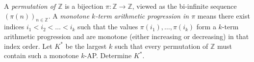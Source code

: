 A \emph{permutation of $\mathbb{Z}$} is a bijection $\pi:\mathbb{Z}\to\mathbb{Z}$, viewed as the bi-infinite sequence $(\pi(n))_{n\in\mathbb{Z}}$.
A \emph{monotone $k$-term arithmetic progression in $\pi$} means there exist indices $i_1<i_2<\dots<i_k$ such that the values
$\pi(i_1),\dots,\pi(i_k)$ form a $k$-term arithmetic progression and are monotone (either increasing or decreasing) in that index order.
Let $K^*$ be the largest $k$ such that every permutation of $\mathbb{Z}$ must contain such a monotone $k$-AP.
Determine $K^*$.
